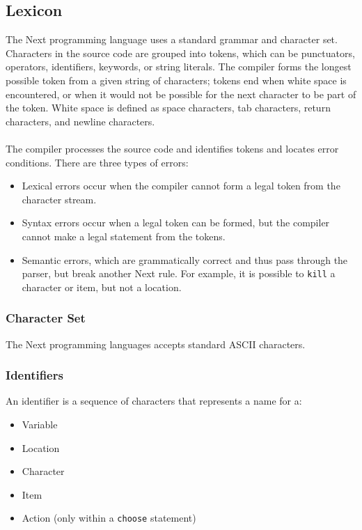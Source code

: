 \documentclass[12pt]{article}
\begin{document}
\subsection{Lexicon}
The Next programming language uses a standard grammar and character set.  Characters in the source code are grouped into tokens, which can be punctuators, operators, identifiers, keywords, or string literals.  The compiler forms the longest possible token from a given string of characters; tokens end when white space is encountered, or when it would not be possible for the next character to be part of the token.  White space is defined as space characters, tab characters, return characters, and newline characters.
\\
\\
\noindent The compiler processes the source code and identifies tokens and locates error conditions.  There are three types of errors:
\begin{itemize}
\item Lexical errors occur when the compiler cannot form a legal token from the character stream.
\item Syntax errors occur when a legal token can be formed, but the compiler cannot make a legal statement from the tokens.
\item Semantic errors, which are grammatically correct and thus pass through the parser, but break another Next rule.  For example, it is possible to \texttt{kill} a character or item, but not a location.
\end{itemize}

\subsubsection{Character Set}
The Next programming languages accepts standard ASCII characters.

\subsubsection{Identifiers}
An identifier is a sequence of characters that represents a name for a:
\begin{itemize}
\item Variable
\item Location
\item Character
\item Item
\item Action (only within a \texttt{choose} statement) \\
\end{itemize}
\end{document}

